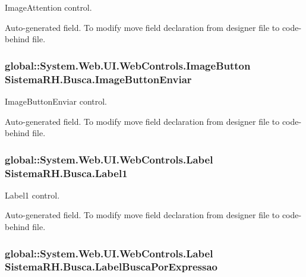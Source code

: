 ImageAttention control. 

Auto-\/generated field. To modify move field declaration from designer file to code-\/behind file. \hypertarget{class_sistema_r_h_1_1_busca_ae1413ccf43863ae7a6a7baf33d8778b7}{
\subsubsection[{ImageButtonEnviar}]{\setlength{\rightskip}{0pt plus 5cm}global::System.Web.UI.WebControls.ImageButton {\bf SistemaRH.Busca.ImageButtonEnviar}}}
\label{class_sistema_r_h_1_1_busca_ae1413ccf43863ae7a6a7baf33d8778b7}


ImageButtonEnviar control. 

Auto-\/generated field. To modify move field declaration from designer file to code-\/behind file. \hypertarget{class_sistema_r_h_1_1_busca_a7cb1087d5d1300385bedcae52bfb289b}{
\subsubsection[{Label1}]{\setlength{\rightskip}{0pt plus 5cm}global::System.Web.UI.WebControls.Label {\bf SistemaRH.Busca.Label1}}}
\label{class_sistema_r_h_1_1_busca_a7cb1087d5d1300385bedcae52bfb289b}


Label1 control. 

Auto-\/generated field. To modify move field declaration from designer file to code-\/behind file. \hypertarget{class_sistema_r_h_1_1_busca_a867cb379b40334a7a0f8807eb420cc14}{
\subsubsection[{LabelBuscaPorExpressao}]{\setlength{\rightskip}{0pt plus 5cm}global::System.Web.UI.WebControls.Label {\bf SistemaRH.Busca.LabelBuscaPorExpressao}}}
\label{class_sistema_r_h_1_1_busca_a867cb379b40334a7a0f8807eb420cc14}


